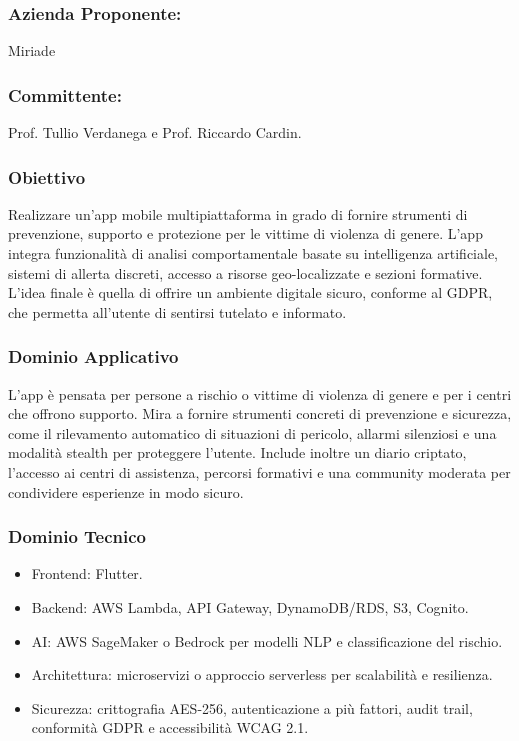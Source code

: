 \documentclass[a4paper,12pt]{article}
\begin{document}
\subsubsection*{Azienda Proponente:} Miriade
\subsubsection*{Committente:} Prof. Tullio Verdanega e Prof. Riccardo Cardin.
\subsubsection*{Obiettivo}
Realizzare un’app mobile multipiattaforma in grado di fornire strumenti di prevenzione, supporto e protezione per le vittime di violenza di genere.  
L’app integra funzionalità di analisi comportamentale basate su intelligenza artificiale, sistemi di allerta discreti, accesso a risorse geo-localizzate e sezioni formative.  
L’idea finale è quella di offrire un ambiente digitale sicuro, conforme al GDPR, che permetta all’utente di sentirsi tutelato e informato.

\subsubsection*{Dominio Applicativo}
L’app è pensata per persone a rischio o vittime di violenza di genere e per i centri che offrono supporto.  
Mira a fornire strumenti concreti di prevenzione e sicurezza, come il rilevamento automatico di situazioni di pericolo, allarmi silenziosi e una modalità stealth per proteggere l’utente.  
Include inoltre un diario criptato, l’accesso ai centri di assistenza, percorsi formativi e una community moderata per condividere esperienze in modo sicuro.


\subsubsection*{Dominio Tecnico}
\begin{itemize}[leftmargin=*]
    \item Frontend: Flutter.
    \item Backend: AWS Lambda, API Gateway, DynamoDB/RDS, S3, Cognito.
    \item AI: AWS SageMaker o Bedrock per modelli NLP e classificazione del rischio.
    \item Architettura: microservizi o approccio serverless per scalabilità e resilienza.
    \item Sicurezza: crittografia AES-256, autenticazione a più fattori, audit trail, conformità GDPR e accessibilità WCAG 2.1.
\end{itemize}
\end{document}
